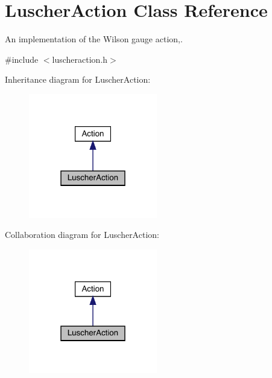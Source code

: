 \hypertarget{class_luscher_action}{}\section{Luscher\+Action Class Reference}
\label{class_luscher_action}


An implementation of the Wilson gauge action,.  




{\ttfamily \#include $<$luscheraction.\+h$>$}



Inheritance diagram for Luscher\+Action\+:
\nopagebreak
\begin{figure}[H]
\begin{center}
\leavevmode
\includegraphics[width=159pt]{class_luscher_action__inherit__graph}
\end{center}
\end{figure}


Collaboration diagram for Luscher\+Action\+:
\nopagebreak
\begin{figure}[H]
\begin{center}
\leavevmode
\includegraphics[width=159pt]{class_luscher_action__coll__graph}
\end{center}
\end{figure}
